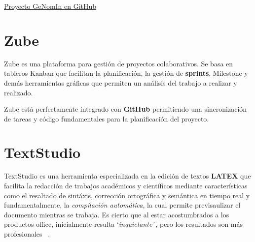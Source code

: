 \href{https://github.com/far0010/TFGUBU-Fran_Arroyo}{Proyecto GeNomIn en GitHub}

\section{Zube}
Zube es una plataforma para gestión de proyectos colaborativos. Se basa en tableros \gls{Kanban} que facilitan la planificación, la gestión de \textbf{sprints}, \gls{Milestone} y demás herramientas gráficas que permiten un análisis del trabajo a realizar y realizado. 

Zube está perfectamente integrado con \textbf{GitHub} permitiendo una sincronización de tareas y código fundamentales para la planificación del proyecto.

\section{TextStudio}

TextStudio es una herramienta especializada en la edición de textos \textbf{\gls{LATEX}} que facilita la redacción de trabajos académicos y científicos mediante características como el resaltado de sintáxis, corrección ortográfica y semántica en tiempo real y fundamentalmente, la \textit{compilación automática}, la cual permite previsaulizar el documento mientras se trabaja. 
Es cierto que al estar acostumbrados a los productos office, inicialmente resulta `\textit{inquietante}´, pero los resultados son más profesionales ~\cite{BibliotecaComplutenseLaTeXTuTFG2024}.
